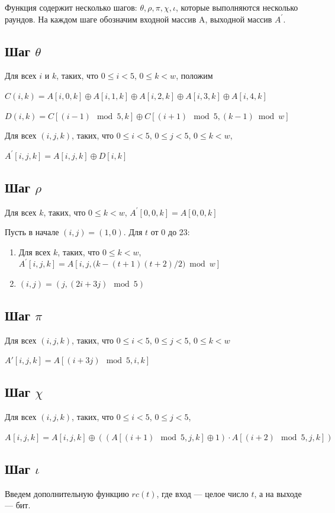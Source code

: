 \documentclass{book}
\begin{document}
Функция содержит несколько шагов: $\theta, \rho, \pi, \chi, \iota$, которые выполняются несколько раундов. На каждом шаге обозначим входной массив A, выходной массив $A^{'}$.
\subsection*{Шаг $\theta$}

Для всех $i$ и $k$, таких, что $0\leqslant i<5$, $0\leqslant k<w$, положим

$C(i,k)=A[i,0,k]\oplus A[i,1,k]\oplus A[i,2,k]\oplus A[i,3,k]\oplus A[i,4,k]$

$D(i,k)=C[(i-1){\mod 5},k]\oplus C[(i+1){\mod 5},(k-1){\bmod w}]$

Для всех $(i,j,k)$, таких, что $0\leqslant i<5$, $0\leqslant j<5$, $0\leqslant k<w$,

$A^{'}[i,j,k]=A[i,j,k]\oplus D[i,k]$
\subsection*{Шаг $\rho$}
Для всех $k$, таких, что $0\leqslant k<w$, $A^{'}[0,0,k]=A[0,0,k]$

Пусть в начале $(i,j)=(1,0)$. Для $t$ от 0 до 23:
\begin{enumerate}
    \item Для всех $k$, таких, что $0\leqslant k<w$, $A^{'}[i,j,k]=A[i,j,(k-(t+1){(t+2)/2)}{\bmod {w}}]$
    \item $(i,j)=(j,(2i+3j){\mod 5})$
    \end{enumerate}

\subsection*{Шаг  $\pi$}

Для всех $(i,j,k)$, таких, что $ 0\leqslant i<5$, $0\leqslant j<5$, $0\leqslant k<w$

$A'[i,j,k]=A[(i+3j){\mod5},i,k]$
\subsection*{Шаг $\chi$ }

Для всех $(i,j,k)$, таких, что $ 0\leqslant i<5$, $0\leqslant j<5$,

$A^{}[i,j,k]=A[i,j,k]\oplus ((A[(i+1){\mod 5},j,k]\oplus 1)\cdot A[(i+2){\mod 5},j,k])$
\subsection*{Шаг $\iota$}
Введем дополнительную функцию $rc(t)$, где вход — целое число $t$, а на выходе — бит.
\end{document}
